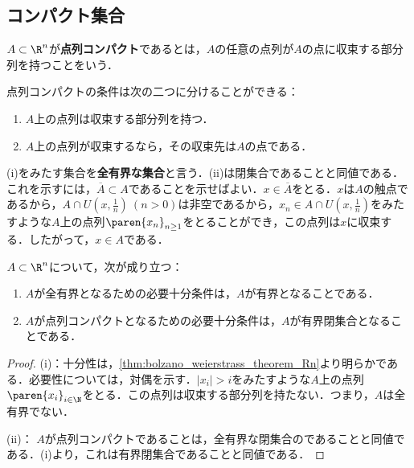 \documentclass[a4paper,10pt]{ltjsarticle}
\begin{document}
\subsection{コンパクト集合}
\label{sec:compact_set}

\begin{MyDefinition}
  \(A \subset \R^n\)が\textbf{点列コンパクト}であるとは，\(A\)の任意の点列が\(A\)の点に収束する部分列を持つことをいう．
\end{MyDefinition}

点列コンパクトの条件は次の二つに分けることができる：
\begin{enumerate}
  \item \(A\)上の点列は収束する部分列を持つ．
  \item \(A\)上の点列が収束するなら，その収束先は\(A\)の点である．
\end{enumerate}
(i)をみたす集合を\textbf{全有界な集合}と言う．(ii)は閉集合であることと同値である．これを示すには，\(\overline A \subset A\)であることを示せばよい．\(x \in \overline A\)をとる．\(x\)は\(A\)の触点であるから，\(A \cap U(x, \frac1n) \ (n > 0)\)は非空であるから，\(x_n \in A \cap U(x, \frac1n)\)をみたすような\(A\)上の点列\(\paren{x_n}_{n\ge1}\)をとることができ，この点列は\(x\)に収束する．したがって，\(x \in A\)である．

\begin{MyTheorem}
  \(A \subset \R^n\)について，次が成り立つ：
  \begin{enumerate}
    \item \(A\)が全有界となるための必要十分条件は，\(A\)が有界となることである．
    \item \(A\)が点列コンパクトとなるための必要十分条件は，\(A\)が有界閉集合となることである．
  \end{enumerate}
\end{MyTheorem}
\begin{proof}
  (i)：十分性は，\cref{thm:bolzano_weierstrass_theorem_Rn}より明らかである．必要性については，対偶を示す．\(|x_i| > i\)をみたすような\(A\)上の点列\(\paren{x_i}_{i\in\N}\)をとる．この点列は収束する部分列を持たない．つまり，\(A\)は全有界でない．

  (ii)： \(A\)が点列コンパクトであることは，全有界な閉集合のであることと同値である．(i)より，これは有界閉集合であることと同値である．
\end{proof}
\end{document}
